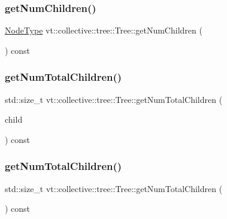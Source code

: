 \subsubsection{\texorpdfstring{get\+Num\+Children()}{getNumChildren()}}
{\footnotesize\ttfamily \hyperlink{namespacevt_a866da9d0efc19c0a1ce79e9e492f47e2}{Node\+Type} vt\+::collective\+::tree\+::\+Tree\+::get\+Num\+Children (\begin{DoxyParamCaption}{ }\end{DoxyParamCaption}) const}

\mbox{\label{structvt_1_1collective_1_1tree_1_1_tree_ac387d211dbc2689a216a3b99bc332507}} 
\subsubsection{\texorpdfstring{get\+Num\+Total\+Children()}{getNumTotalChildren()}\hspace{0.1cm}{\footnotesize\ttfamily [1/2]}}
{\footnotesize\ttfamily std\+::size\+\_\+t vt\+::collective\+::tree\+::\+Tree\+::get\+Num\+Total\+Children (\begin{DoxyParamCaption}\item[{\hyperlink{namespacevt_a866da9d0efc19c0a1ce79e9e492f47e2}{Node\+Type}}]{child }\end{DoxyParamCaption}) const}

\mbox{\label{structvt_1_1collective_1_1tree_1_1_tree_a294b7827285c140d412a4344f3b135d5}} 
\subsubsection{\texorpdfstring{get\+Num\+Total\+Children()}{getNumTotalChildren()}\hspace{0.1cm}{\footnotesize\ttfamily [2/2]}}
{\footnotesize\ttfamily std\+::size\+\_\+t vt\+::collective\+::tree\+::\+Tree\+::get\+Num\+Total\+Children (\begin{DoxyParamCaption}{ }\end{DoxyParamCaption}) const}

